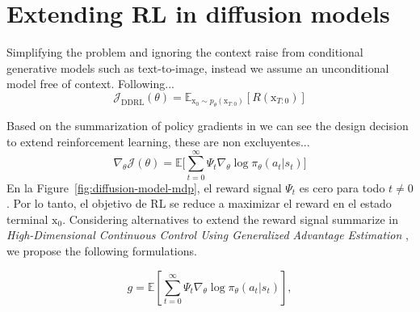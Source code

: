 \section{Extending RL in diffusion models}\label{sec:extending-methodology}


Simplifying the problem and ignoring the context raise from conditional generative models such as text-to-image, instead we assume an unconditional model free of context. Following...
\begin{equation}\label{difusion-rl-objective-2}
  \mathcal{J}_{\text{DDRL}}(\theta)
  = \mathbb{E}_{\mathrm{x}_{0}\sim p_{\theta}(\mathrm{x}_{T:0})}[R(\mathrm{x}_{T:0})]
\end{equation}

Based on the summarization of policy gradients in \cite{schulman2015high} we can see the design decision to extend reinforcement learning, these are non excluyentes...
\begin{equation}\label{eqn:general-pg-estimation-form}
  \nabla_{\theta}\mathcal{J}(\theta) = \mathbb{E}\bigg[\sum_{t=0}^{\infty}\Psi_{t}\nabla_{\theta}\log\pi_{\theta}(a_{t}|s_{t}) \bigg]
\end{equation}
En la Figure~\ref{fig:diffusion-model-mdp}, el reward signal $\Psi_{t}$ es cero para todo $t\neq0$. Por lo tanto, el objetivo de RL se reduce a maximizar el reward en el estado terminal $\mathrm{x}_{0}$. Considering alternatives
to extend the reward signal summarize in \textit{High-Dimensional Continuous Control Using Generalized Advantage Estimation} \cite{schulman2015high}, we propose the following formulations.

\begin{equation}
  g = \mathbb{E} \left[ \sum_{t=0}^{\infty} \Psi_t \nabla_\theta \log \pi_\theta (a_t | s_t) \right],
  \end{equation}
  
